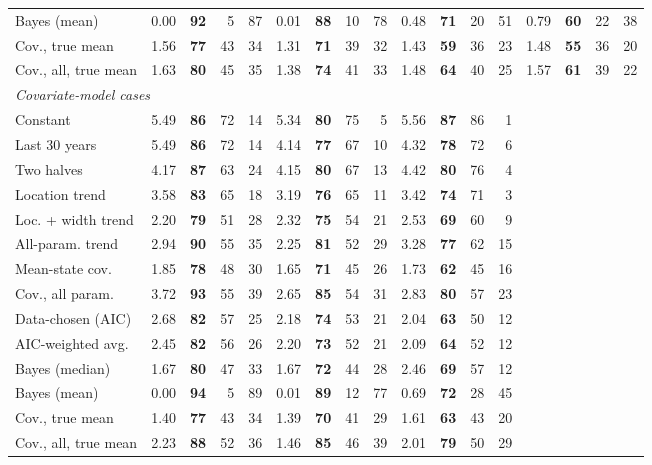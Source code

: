 \begin{tabular}{lrrrrrrrrrrrrrrrr}
Bayes (mean) & 0.00 & \textbf{92} & 5 & 87 & 0.01 & \textbf{88} & 10 & 78 & 0.48 & \textbf{71} & 20 & 51 & 0.79 & \textbf{60} & 22 & 38 \\
Cov., true mean & 1.56 & \textbf{77} & 43 & 34 & 1.31 & \textbf{71} & 39 & 32 & 1.43 & \textbf{59} & 36 & 23 & 1.48 & \textbf{55} & 36 & 20 \\
Cov., all, true mean & 1.63 & \textbf{80} & 45 & 35 & 1.38 & \textbf{74} & 41 & 33 & 1.48 & \textbf{64} & 40 & 25 & 1.57 & \textbf{61} & 39 & 22 \\
\multicolumn{17}{l}{\emph{Covariate-model cases}} \\
Constant & 5.49 & \textbf{86} & 72 & 14 & 5.34 & \textbf{80} & 75 & 5 & 5.56 & \textbf{87} & 86 & 1 &  &  &  &  \\
Last 30 years & 5.49 & \textbf{86} & 72 & 14 & 4.14 & \textbf{77} & 67 & 10 & 4.32 & \textbf{78} & 72 & 6 &  &  &  &  \\
Two halves & 4.17 & \textbf{87} & 63 & 24 & 4.15 & \textbf{80} & 67 & 13 & 4.42 & \textbf{80} & 76 & 4 &  &  &  &  \\
Location trend & 3.58 & \textbf{83} & 65 & 18 & 3.19 & \textbf{76} & 65 & 11 & 3.42 & \textbf{74} & 71 & 3 &  &  &  &  \\
Loc. + width trend & 2.20 & \textbf{79} & 51 & 28 & 2.32 & \textbf{75} & 54 & 21 & 2.53 & \textbf{69} & 60 & 9 &  &  &  &  \\
All-param. trend & 2.94 & \textbf{90} & 55 & 35 & 2.25 & \textbf{81} & 52 & 29 & 3.28 & \textbf{77} & 62 & 15 &  &  &  &  \\
Mean-state cov. & 1.85 & \textbf{78} & 48 & 30 & 1.65 & \textbf{71} & 45 & 26 & 1.73 & \textbf{62} & 45 & 16 &  &  &  &  \\
Cov., all param. & 3.72 & \textbf{93} & 55 & 39 & 2.65 & \textbf{85} & 54 & 31 & 2.83 & \textbf{80} & 57 & 23 &  &  &  &  \\
Data-chosen (AIC) & 2.68 & \textbf{82} & 57 & 25 & 2.18 & \textbf{74} & 53 & 21 & 2.04 & \textbf{63} & 50 & 12 &  &  &  &  \\
AIC-weighted avg. & 2.45 & \textbf{82} & 56 & 26 & 2.20 & \textbf{73} & 52 & 21 & 2.09 & \textbf{64} & 52 & 12 &  &  &  &  \\
Bayes (median) & 1.67 & \textbf{80} & 47 & 33 & 1.67 & \textbf{72} & 44 & 28 & 2.46 & \textbf{69} & 57 & 12 &  &  &  &  \\
Bayes (mean) & 0.00 & \textbf{94} & 5 & 89 & 0.01 & \textbf{89} & 12 & 77 & 0.69 & \textbf{72} & 28 & 45 &  &  &  &  \\
Cov., true mean & 1.40 & \textbf{77} & 43 & 34 & 1.39 & \textbf{70} & 41 & 29 & 1.61 & \textbf{63} & 43 & 20 &  &  &  &  \\
Cov., all, true mean & 2.23 & \textbf{88} & 52 & 36 & 1.46 & \textbf{85} & 46 & 39 & 2.01 & \textbf{79} & 50 & 29 &  &  &  &  \\
\bottomrule
\end{tabular}
